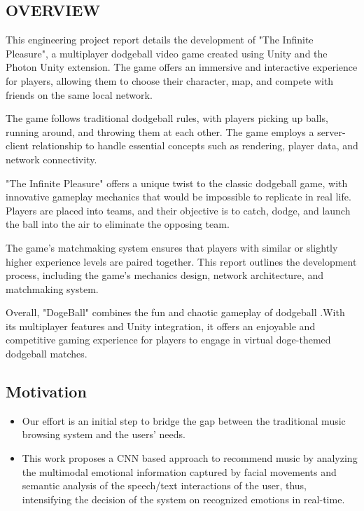 \documentclass[12pt]{report}
\begin{document}
\subsection{OVERVIEW}

\justifying
\setlength{\parindent}{4em}
\setlength{\parskip}{0.5em}
\renewcommand{\baselinestretch}{1.5}

\normalsize
\hspace{1.7cm}
This engineering project report details the development of "The Infinite Pleasure", a multiplayer dodgeball video game created using Unity and the Photon Unity extension. The game offers an immersive and interactive experience for players, allowing them to choose their character, map, and compete with friends on the same local network.

The game follows traditional dodgeball rules, with players picking up balls, running around, and throwing them at each other. The game employs a server-client relationship to handle essential concepts such as rendering, player data, and network connectivity.

"The Infinite Pleasure" offers a unique twist to the classic dodgeball game, with innovative gameplay mechanics that would be impossible to replicate in real life. Players are placed into teams, and their objective is to catch, dodge, and launch the ball into the air to eliminate the opposing team.

The game's matchmaking system ensures that players with similar or slightly higher experience levels are paired together. This report outlines the development process, including the game's mechanics design, network architecture, and matchmaking system.

Overall, "DogeBall" combines the fun and chaotic gameplay of dodgeball .With its multiplayer features and Unity integration, it offers an enjoyable and competitive gaming experience for players to engage in virtual doge-themed dodgeball matches.



\clearpage

\raggedright
\subsection{ Motivation}

\justifying
\setlength{\parindent}{4em}
\setlength{\parskip}{0.5em}
\renewcommand{\baselinestretch}{1.5}
\normalsize\hspace{1.7cm}\begin{itemize} \item Our effort is an initial step to bridge the gap between the traditional music browsing
system and the users’ needs.

\item This work proposes a CNN based approach to recommend music by analyzing the 
multimodal emotional information captured by facial movements and semantic analysis 
of the speech/text interactions of the user, thus, intensifying the decision of the system on 
recognized emotions in real-time.\\
\end{itemize}
\raggedright
\end{document}
